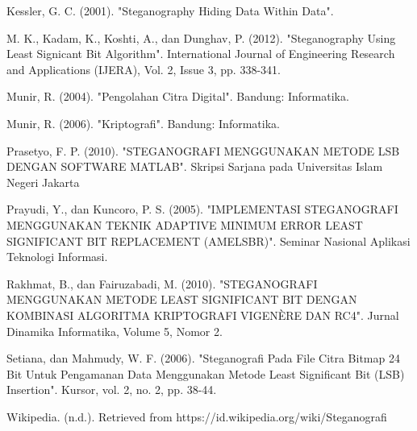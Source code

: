 \documentclass{jtetiskripsi}
\begin{document}
\begin{thebibliography}{99}
	Kessler, G. C. (2001). "Steganography Hiding Data Within Data".
	
	M. K., Kadam, K., Koshti, A., dan Dunghav, P. (2012). "Steganography Using Least Signicant Bit Algorithm". International Journal of Engineering Research and Applications (IJERA), Vol. 2, Issue 3, pp. 338-341.
	
	Munir, R. (2004). "Pengolahan Citra Digital". Bandung: Informatika.
	
	Munir, R. (2006). "Kriptografi". Bandung: Informatika.
	
	Prasetyo, F. P. (2010). "STEGANOGRAFI MENGGUNAKAN METODE LSB DENGAN SOFTWARE MATLAB". Skripsi Sarjana pada Universitas Islam Negeri Jakarta
	
	Prayudi, Y., dan Kuncoro, P. S. (2005). "IMPLEMENTASI STEGANOGRAFI MENGGUNAKAN TEKNIK ADAPTIVE MINIMUM ERROR LEAST SIGNIFICANT BIT REPLACEMENT (AMELSBR)". Seminar Nasional Aplikasi Teknologi Informasi.
	
	Rakhmat, B., dan Fairuzabadi, M. (2010). "STEGANOGRAFI MENGGUNAKAN METODE LEAST SIGNIFICANT BIT DENGAN KOMBINASI ALGORITMA KRIPTOGRAFI VIGENÈRE DAN RC4". Jurnal Dinamika Informatika, Volume 5, Nomor 2.
	
	Setiana, dan Mahmudy, W. F. (2006). "Steganografi Pada File Citra Bitmap 24 Bit Untuk Pengamanan Data Menggunakan Metode Least Significant Bit (LSB) Insertion". Kursor, vol. 2, no. 2, pp. 38-44.
	
	Wikipedia. (n.d.). Retrieved from https://id.wikipedia.org/wiki/Steganografi
		
		
	
\end{thebibliography}

%

%
\end{document}
